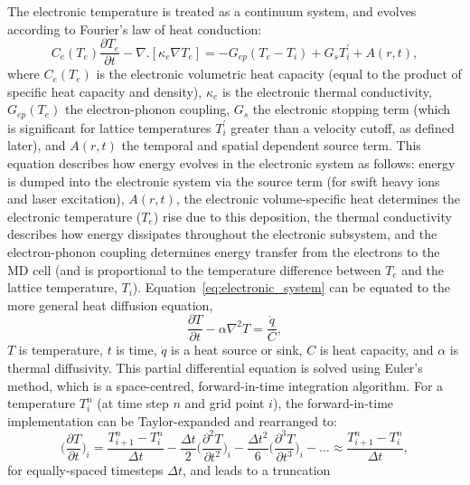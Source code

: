 The electronic temperature is treated as a continuum system, and evolves 
according to Fourier's law of heat conduction:
\begin{equation} \label{eq:electronic_system}
C_e(T_e) \frac{\partial T_e}{\partial t} - \nabla . [\kappa_e \nabla T_e ] = -G_{ep}(T_e - T_i) + G_s T^{\prime}_i + A(r,t),
\end{equation}
where $C_e(T_e)$ is the electronic volumetric heat capacity (equal to the 
product of specific heat capacity and density), $\kappa_e$ is the 
electronic thermal conductivity, $G_{ep}(T_e)$ the electron-phonon 
coupling, $G_s$ the electronic stopping term (which is significant for 
lattice temperatures $T^{\prime}_i$ greater than a velocity cutoff, as defined later), 
and $A(r,t)$ the temporal and spatial dependent source term. This equation 
describes how energy evolves in the electronic system as follows: energy 
is dumped into the electronic system via the source term (for swift heavy 
ions and laser excitation), $A(r,t)$, the electronic volume-specific heat 
determines the electronic temperature ($T_e$) rise due to this deposition, 
the thermal conductivity describes how energy dissipates throughout the 
electronic subsystem, and the electron-phonon coupling determines 
energy transfer from the electrons to the MD cell (and is proportional to 
the temperature difference between $T_e$ and the lattice temperature, 
$T_i$). Equation~\ref{eq:electronic_system} can be equated to the 
more general heat diffusion equation,
\begin{equation} \label{eq:heatdiffusion}
\frac{\partial T}{\partial t} - \alpha \nabla^2 T = \frac{\dot{q}}{C},
\end{equation}
$T$ is temperature, $t$ is time, $\dot{q}$ is a heat source or sink, 
$C$ is heat capacity, and $\alpha$ is thermal diffusivity. This partial 
differential equation is solved using Euler's method, which is a 
space-centred, forward-in-time integration algorithm. For a 
temperature $T_{i}^{n}$ (at time step $n$ and grid point $i$), the 
forward-in-time implementation can be Taylor-expanded and 
rearranged to:
\begin{equation}
\bigg(\frac{\partial T}{\partial t}\bigg)_i = \frac{T_{i+1}^n - T_{i}^n}{\Delta t} - \frac{\Delta t}{2}\bigg(\frac{\partial^2 T}{\partial t^2}\bigg)_i  - \frac{\Delta t^2}{6}\bigg(\frac{\partial^3 T}{\partial t^3}\bigg)_i - \dots \approx \frac{T_{i+1}^n - T_{i}^n}{\Delta t} ,
\end{equation}
for equally-spaced timesteps $\Delta t$, and leads to a truncation 

